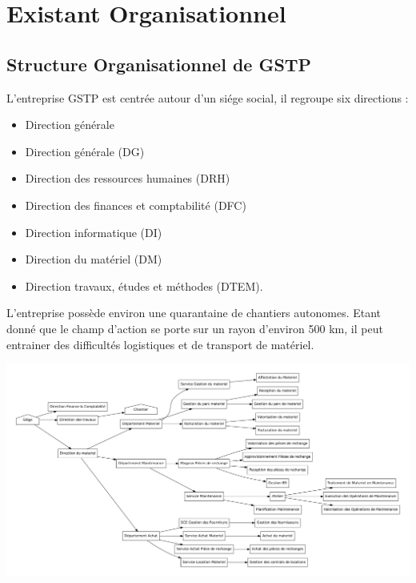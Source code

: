 \section{Existant Organisationnel}
    \subsection{Structure Organisationnel de GSTP}

		L'entreprise GSTP est centrée autour d'un siége social, il regroupe six directions :
	    \begin{itemize}
            \item Direction générale
            \item Direction générale (DG)
			\item Direction des ressources humaines (DRH)
			\item Direction des finances et comptabilité (DFC)
			\item Direction informatique (DI)
			\item Direction du matériel (DM)
			\item Direction travaux, études et méthodes (DTEM).
        \end{itemize}
        L'entreprise possède environ une quarantaine de chantiers autonomes. Etant donné que le champ d'action se porte sur un rayon d'environ 500 km, il peut entrainer des difficultés logistiques et de transport de matériel.

		\includegraphics[width=\textwidth]{img/structureOrganisationnel.pdf} 
		
